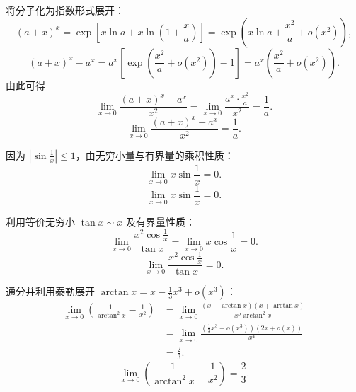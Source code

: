 \begin{solution}
    将分子化为指数形式展开：
    \begin{equation}
        (a+x)^x = \exp\left[ x\ln a + x\ln\left(1 + \frac{x}{a}\right) \right] = \exp\left( x\ln a + \frac{x^2}{a} + o(x^2) \right),
    \end{equation}
    \begin{equation}
        (a+x)^x - a^x = a^x \left[ \exp\left(\frac{x^2}{a} + o(x^2)\right) - 1 \right] = a^x \left( \frac{x^2}{a} + o(x^2) \right).
    \end{equation}
    由此可得
    \begin{equation}
        \lim_{x\to 0} \frac{(a+x)^x - a^x}{x^2} = \lim_{x\to 0} \frac{a^x \cdot \frac{x^2}{a}}{x^2} = \frac{1}{a}.
    \end{equation}
    \begin{equation}
        \boxed{\lim_{x\to 0} \frac{(a+x)^x - a^x}{x^2} = \frac{1}{a}.}
    \end{equation}


    因为 $|\sin \frac{1}{x}| \leqslant 1$，由无穷小量与有界量的乘积性质：
    \begin{equation}
        \lim_{x\to 0} x \sin \frac{1}{x} = 0.
    \end{equation}
    \begin{equation}
        \boxed{\lim_{x\to 0} x \sin \frac{1}{x} = 0.}
    \end{equation}


    利用等价无穷小 $\tan x \sim x$ 及有界量性质：
    \begin{equation}
        \lim_{x\to 0} \frac{x^2 \cos \frac{1}{x}}{\tan x} = \lim_{x\to 0} x \cos \frac{1}{x} = 0.
    \end{equation}
    \begin{equation}
        \boxed{\lim_{x\to 0} \frac{x^2 \cos \frac{1}{x}}{\tan x} = 0.}
    \end{equation}


    通分并利用泰勒展开 $\arctan x = x - \frac{1}{3}x^3 + o(x^3)$：
    \begin{equation}
        \begin{aligned}
            \lim_{x\to 0} \left( \frac{1}{\arctan^2 x} - \frac{1}{x^2} \right) & = \lim_{x\to 0} \frac{(x - \arctan x)(x + \arctan x)}{x^2 \arctan^2 x}        \\
                                                                               & = \lim_{x\to 0} \frac{\left( \frac{1}{3}x^3 + o(x^3) \right)(2x + o(x))}{x^4} \\
                                                                               & = \frac{2}{3}.
        \end{aligned}
    \end{equation}
    \begin{equation}
        \boxed{\lim_{x\to 0} \left( \frac{1}{\arctan^2 x} - \frac{1}{x^2} \right) = \frac{2}{3}.}
    \end{equation}


\end{solution}
